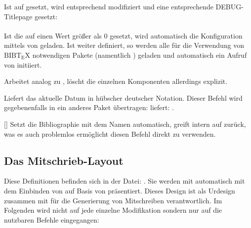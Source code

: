 Ist  auf  gesetzt, wird  entsprechend modifiziert und eine entsprechende DEBUG-Titlepage gesetzt:\smallskip\\
\makeatletter%
\framebox{%
    \@@Debug@Page@Content%
}~\\

Ist die  auf einen Wert größer als $0$ gesetzt, wird automatisch die Konfiguration mittels von  geladen. Ist weiter  definiert, so werden alle für die Verwendung von $\mathrm{B{\scriptstyle{IB}} \! T\!_{\displaystyle E} \! X}$ %
 notwendigen Pakete (namentlich ) geladen und automatisch ein Aufruf von  initiiert.

%
%
%

Arbeitet analog zu , löscht die einzelnen Komponenten allerdings explizit.

%
%
%

Liefert das aktuelle Datum in hübscher deutscher Notation. Dieser Befehl wird gegebenenfalls in ein anderes Paket übertragen:  liefert: \heute.

%
%
%

[]
Setzt die Bibliographie mit dem Namen  automatisch, greift intern auf  zurück, was es auch problemlos ermöglicht diesen Befehl direkt zu verwenden.

%
%
%
%
%

\subsection{Das Mitschrieb-Layout}
Diese Definitionen befinden sich in der Datei: . Sie werden mit  automatisch mit dem Einbinden von  auf Basis von  präsentiert. \newline
Dieses Design ist als Urdesign zusammen mit  für die Generierung von Mitschreiben verantwortlich. Im Folgenden wird nicht auf jede einzelne Modifikation sondern nur auf die nutzbaren Befehle eingegangen:
\begin{tcbraster}[raster columns=3, blankest,graphics pages={1,2,3,5,7,9},colback=white]
\end{tcbraster}

